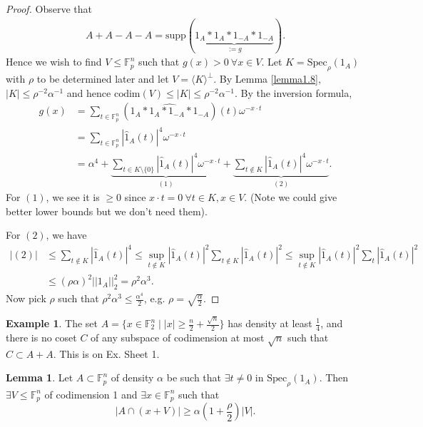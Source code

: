 \documentclass{article}
\theoremstyle{definition}
\newtheorem{lemma}[theorem]{Lemma}
\newtheorem{example}[theorem]{Example}
\begin{document}
\begin{proof}
    Observe that 
    \begin{align*}
        A+A-A-A = \text{supp}(\underbrace{1_A * 1_A * 1_{-A} * 1_{-A}}_{:= g}).
    \end{align*}
    Hence we wish to find $V \le \mathbb{F}_p^n$ such that $g(x) > 0 ~\forall x \in V$. Let $K = \text{Spec}_{\rho}(1_A)$ with $\rho$ to be determined later and let $V = \langle K \rangle^{\perp}$. By Lemma \ref{lemma1.8}, $|K|\le \rho^{-2}\alpha^{-1}$ and hence $\text{codim}(V)\le |K| \le \rho^{-2}\alpha^{-1}$. By the inversion formula, 
    \begin{align*}
        g(x) &= \sum_{t \in \mathbb{F}_p^n}^{} (\widehat{1_A * 1_A * 1_{-A} * 1_{-A}})(t)\omega^{-x\cdot t} \\
        &= \sum_{t \in \mathbb{F}_p^n}^{} |\hat{1}_A(t)|^4 \omega^{-x\cdot t} \\
        &= \alpha^4 + \underbrace{\sum_{t \in K \setminus \{0\}}^{} |\hat{1}_A(t)|^4 \omega^{-x \cdot t}}_{(1)} + \underbrace{\sum_{t \not\in K}^{} |\hat{1}_A(t)|^4 \omega^{-x \cdot t}}_{(2)}.
    \end{align*}
    For $(1)$, we see it is $\ge 0$ since $x \cdot t = 0 ~\forall t \in K, x \in V$. (Note we could give better lower bounds but we don't need them).
    \vspace{1mm}
     
    For $(2)$, we have 
    \begin{align*}
        |(2)| &\le \sum_{t \not\in K}^{} |\hat{1}_A(t)|^4 \le \sup_{t \not\in K} |\hat{1}_A(t)|^2 \sum_{t \not\in K}^{} |\hat{1}_A(t)|^2 \le \sup_{t \not\in K} |\hat{1}_A(t)|^2 \sum_{t}^{} |\hat{1}_A(t)|^2 \\
        &\le (\rho \alpha)^2 ||1_A||_2^2 = \rho^2 \alpha^3.
    \end{align*}
    Now pick $\rho$ such that $\rho^2 \alpha^3 \le \frac{\alpha^4}{2}$, e.g. $\rho = \sqrt{\frac{\alpha}{2}}$.
\end{proof}
\begin{example}
    The set $A = \{x \in \mathbb{F}_2^n \mid |x|\ge \frac{n}{2}+\frac{\sqrt{n}}{2}\}$ has density at least $\frac{1}{4}$, and there is no coset $C$ of any subspace of codimension at most $\sqrt{n}$ such that $C \subset A + A$. This is on Ex. Sheet 1.
\end{example}
\begin{lemma}\label{lemma1.15}
    Let $A \subset \mathbb{F}_p^n$ of density $\alpha$ be such that $\exists t \neq 0$ in $\text{Spec}_{\rho}(1_A)$. Then $\exists V \le \mathbb{F}_p^n$ of codimension 1 and $\exists x \in \mathbb{F}_p^n$ such that \[
    |A \cap (x+V)| \ge \alpha \left(1+\frac{\rho}{2}\right)|V|.
    \]
\end{lemma}
\end{document}
